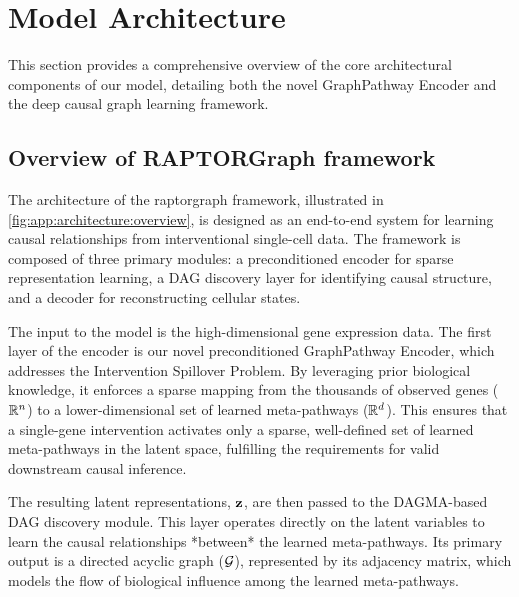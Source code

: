 \section{Model Architecture}
\label{app:architecture}

This section provides a comprehensive overview of the core architectural components of our model, detailing both the novel GraphPathway Encoder and the deep causal graph learning framework.

\subsection{Overview of RAPTORGraph framework}
\label{app:architecture:overview}

The architecture of the \gls{raptorgraph} framework, illustrated in \cref{fig:app:architecture:overview}, is designed as an end-to-end system for learning causal relationships from interventional single-cell data.
The framework is composed of three primary modules: a preconditioned encoder for sparse representation learning, a DAG discovery layer for identifying causal structure, and a decoder for reconstructing cellular states.

The input to the model is the high-dimensional gene expression data.
The first layer of the encoder is our novel preconditioned GraphPathway Encoder, which addresses the Intervention Spillover Problem.
By leveraging prior biological knowledge, it enforces a sparse mapping from the thousands of observed genes (${\mathbb{R}}^{n}$) to a lower-dimensional set of learned meta-pathways (${\mathbb{R}}^{d}$).
This ensures that a single-gene intervention activates only a sparse, well-defined set of learned meta-pathways in the latent space, fulfilling the requirements for valid downstream causal inference.

The resulting latent representations, ${\mathbf{z}}$, are then passed to the DAGMA-based DAG discovery module.
This layer operates directly on the latent variables to learn the causal relationships *between* the learned meta-pathways.
Its primary output is a directed acyclic graph (${\mathcal{G}}$), represented by its adjacency matrix, which models the flow of biological influence among the learned meta-pathways.

